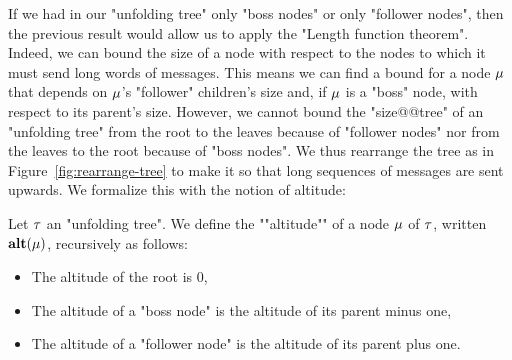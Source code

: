 
If we had in our "unfolding tree" only "boss nodes" or only "follower nodes", then the previous result would allow us to apply the "Length function theorem". Indeed, we can bound the size of a node with respect to the nodes to which it must send long words of messages. This means we can find a bound for a node $\mu$ that depends on $\mu$'s "follower" children's size and, if $\mu$ is a "boss" node, with respect to its parent's size. However, we cannot bound the "size@@tree" of an "unfolding tree" from the root to the leaves because of "follower nodes" nor from the leaves to the root because of "boss nodes". We thus rearrange the tree as in Figure~\ref{fig:rearrange-tree} to make it so that long sequences of messages are sent upwards. We formalize this with the notion of altitude:

\begin{definition}
	Let $\tau$ an "unfolding tree". We define the ""altitude"" of a node $\mu$ of $\tau$, written $\mathbf{alt}(\mu)$, recursively as follows:
	\begin{itemize}
		\item The altitude of the root is $0$,
		\item The altitude of a "boss node" is the altitude of its parent minus one,
		\item The altitude of a "follower node" is the altitude of its parent plus one.
	\end{itemize}
\end{definition}


